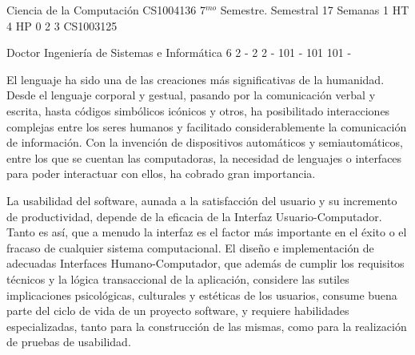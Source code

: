 \documentclass[a4paper,8pt]{article}
\begin{document}
\setNombreProfesor{}
\setGradoProfesorAbreviado{}
\sylabusHeader

\academicaTable
{Ciencia de la Computación} %
{CS1004136} %
{7$^{mo}$ Semestre.} %
{Semestral} %
{17 Semanas} %
{1 HT} %
{4 HP} %
{0} %
{}  %
{2} %
{3} %
{CS1003125} %

\administrativaTable
{Doctor} %
{Ingeniería de Sistemas e Informática} %
{6} %
{2} %
{-} %
{2} %
{2} %
{-} %
{101} %
{-} %
{101} %
{101} %
{-} %


\begin{fundamentacion}
El lenguaje ha sido una de las creaciones más significativas de la humanidad. Desde el lenguaje corporal y gestual, 
pasando por la comunicación verbal y escrita, hasta códigos simbólicos icónicos y otros, ha posibilitado interacciones complejas 
entre los seres humanos y facilitado considerablemente la comunicación de información. 
Con la invención de dispositivos automáticos y semiautomáticos, entre los que se cuentan las computadoras, 
la necesidad de lenguajes o interfaces para poder interactuar con ellos, ha cobrado gran importancia. 

La usabilidad del software, aunada a la satisfacción del usuario y su incremento de productividad, depende de la eficacia de la Interfaz Usuario-Computador.
Tanto es así, que a menudo la interfaz es el factor más importante en el éxito o el fracaso de cualquier sistema computacional. 
El diseño e implementación de adecuadas Interfaces Humano-Computador, que además de cumplir los requisitos técnicos y la 
lógica transaccional de la aplicación, considere las sutiles implicaciones psicológicas, culturales y estéticas de los usuarios, 
consume buena parte del ciclo de vida de un proyecto software, y requiere habilidades especializadas, 
tanto para la construcción de las mismas, como para la realización de pruebas de usabilidad.

\end{fundamentacion}
\end{document}
